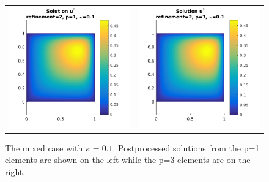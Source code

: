 \documentclass{article}
\begin{document}
\begin{figure}[!ht]
\begin{tabular}{c c}
\includegraphics[scale=0.7]{umustar_132.png} &
\includegraphics[scale=0.7]{umustar_232.png}
\end{tabular}
\caption{The mixed case with $\kappa = 0.1$. Postprocessed solutions from the p=1 elements are shown on the left while the p=3 elements are on the right.}
\label{fig:ustar10}
\end{figure}
\end{document}
